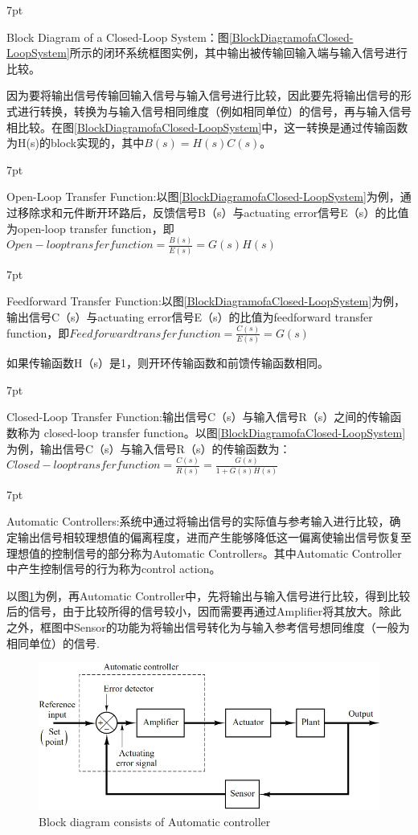 \documentclass{article}
\numberwithin{equation}{section}
\numberwithin{figure}{section}
\newenvironment{formal}{%
\def\FrameCommand{%
\hspace{1pt}%
{\color{DarkBlue}\vrule width 2pt}%
{\color{formalshade}\vrule width 4pt}%
\colorbox{formalshade}%
}%
\MakeFramed{\advance\hsize-\width\FrameRestore}%
\noindent\hspace{-4.55pt}%
\begin{adjustwidth}{}{7pt}%
\vspace{2pt}\vspace{2pt}%
}
{%
\vspace{2pt}\end{adjustwidth}\endMakeFramed%
}
\begin{document}
\begin{formal}
    Block Diagram of a Closed-Loop System：图\ref{BlockDiagramofaClosed-LoopSystem}所示的闭环系统框图实例，其中输出被传输回输入端与输入信号进行比较。
\end{formal}
因为要将输出信号传输回输入信号与输入信号进行比较，因此要先将输出信号的形式进行转换，转换为与输入信号相同维度（例如相同单位）的信号，再与输入信号相比较。在图\ref{BlockDiagramofaClosed-LoopSystem}中，这一转换是通过传输函数为H(s)的block实现的，其中$B(s)=H(s)C(s)$。
\begin{formal}
    Open-Loop Transfer Function:以图\ref{BlockDiagramofaClosed-LoopSystem}为例，通过移除求和元件断开环路后，反馈信号B（s）与actuating error信号E（s）的比值为open-loop transfer function，即$Open-loop transfer function = \frac{B(s)}{E(s)} = G(s)H(s)$
\end{formal}
\begin{formal}
    Feedforward Transfer Function:以图\ref{BlockDiagramofaClosed-LoopSystem}为例，输出信号C（s）与actuating error信号E（s）的比值为feedforward transfer function，即$Feedforward transfer function = \frac{C(s)}{E(s)} = G(s)$
\end{formal}
如果传输函数H（s）是1，则开环传输函数和前馈传输函数相同。
\begin{formal}
    Closed-Loop Transfer Function:输出信号C（s）与输入信号R（s）之间的传输函数称为 closed-loop transfer function。以图\ref{BlockDiagramofaClosed-LoopSystem}为例，输出信号C（s）与输入信号R（s）的传输函数为：
    $Closed-loop transfer function=\frac{C(s)}{R(s)}=\frac{G(s)}{1+G(s)H(s)}$
\end{formal}

\begin{formal}
    Automatic Controllers:系统中通过将输出信号的实际值与参考输入进行比较，确定输出信号相较理想值的偏离程度，进而产生能够降低这一偏离使输出信号恢复至理想值的控制信号的部分称为Automatic Controllers。其中Automatic Controller中产生控制信号的行为称为control action。
\end{formal}
以图\ref{Automaticcontroller}为例，再Automatic Controller中，先将输出与输入信号进行比较，得到比较后的信号，由于比较所得的信号较小，因而需要再通过Amplifier将其放大。除此之外，框图中Sensor的功能为将输出信号转化为与输入参考信号想同维度（一般为相同单位）的信号.
\begin{figure}
    \centering
    \includegraphics[width=.7\textwidth]{Chapter2/Automatic controller.png} %
    \caption{Block diagram consists of Automatic controller} %
    \label{Automaticcontroller} %
\end{figure}
\end{document}
